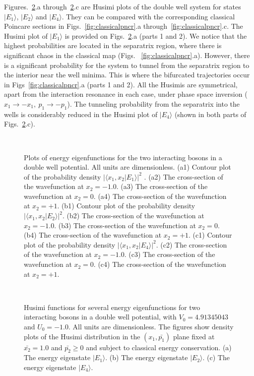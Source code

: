 Figures.~\ref{fig:husimis}.a through~\ref{fig:husimis}.c are Husimi plots of the double well system for states $|E_1\rangle$, $|E_2\rangle$ and $|E_4\rangle$. They can be compared with the corresponding classical Poincare sections in Figs.~\ref{fig:classicalpncr}.a through~\ref{fig:classicalpncr}.c. The Husimi plot of $|E_1\rangle$ is provided on Figs.~\ref{fig:husimis}.a (parts 1 and 2). We notice that the highest probabilities are located in the separatrix region, where there is significant chaos in the classical map (Figs. ~\ref{fig:classicalpncr}.a). However, there is a significant probability for the system to tunnel from the separatrix region to the interior near the well minima. This is where the bifurcated trajectories occur in Figs~\ref{fig:classicalpncr}.a (parts 1 and 2). All the Husimis are symmetrical, apart from the interaction resonance in each case, under phase space inversion ($x_1{\rightarrow}-x_1,~p_1{\rightarrow}-p_1$). 
The tunneling probability from the separatrix into the wells is considerably reduced in the Husimi plot of $|E_4\rangle$ (shown in both parts of Figs.~\ref{fig:husimis}.c). 
\begin{figure}
\ 
\caption{Plots of energy eigenfunctions for the two interacting bosons in a double well potential. All units are dimensionless. (a1) Contour plot of the  probability density $|\langle x_1,x_2|E_1\rangle|^2$ .  (a2) The cross-section of the wavefunction at $x_2 = -1.0$. (a3) The cross-section of the wavefunction at $x_2 = 0$.  (a4) The cross-section of the wavefunction at $x_2 = +1$. (b1) Contour plot of the  probability density $|\langle x_1,x_2|E_2\rangle|^2$.  (b2) The cross-section of the wavefunction at $x_2 = -1.0$. (b3) The cross-section of the wavefunction at $x_2 = 0$. (b4) The cross-section of the wavefunction at $x_2 = +1$. (c1) Contour plot of the  probability density $|\langle x_1,x_2|E_4\rangle|^2$. (c2) The cross-section of the wavefunction at $x_2 = -1.0$. (c3) The cross-section of the wavefunction at $x_2 = 0$. (c4)  The cross-section of the wavefunction at $x_2 = +1$.}
\label{fig:wavefunctions}
\end{figure}

\begin{figure} 
\ 
\caption{Husimi functions  for several energy eigenfunctions for two interacting bosons in a double well potential, with $V_0=4.91345043$ and $U_0=-1.0$. All units are dimensionless. The figures show density plots of the Husimi distribution in the $({x_1} , \bar{p_1})$ plane fixed at $\bar{x_2}=1.0$ and $\bar{p_2}\geq 0$ and subject to classical energy conservation. (a) The energy eigenstate $|E_1{\rangle}$.  (b) The energy eigenstate $|E_2{\rangle}$. (c) The energy eigenstate $|E_4{\rangle}$.}
\label{fig:husimis}
\end{figure}
%
%
